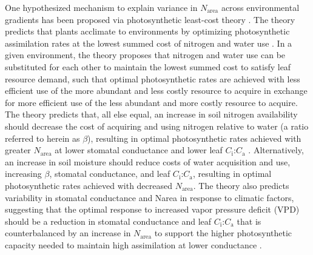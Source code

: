 One hypothesized mechanism to explain variance in $N_\mathrm{area}$ across environmental gradients has been proposed via photosynthetic least-cost theory . The theory predicts that plants acclimate to environments by optimizing photosynthetic assimilation rates at the lowest summed cost of nitrogen and water use . In a given environment, the theory proposes that nitrogen and water use can be substituted for each other to maintain the lowest summed cost to satisfy leaf resource demand, such that optimal photosynthetic rates are achieved with less efficient use of the more abundant and less costly resource to acquire in exchange for more efficient use of the less abundant and more costly resource to acquire. The theory predicts that, all else equal, an increase in soil nitrogen availability should decrease the cost of acquiring and using nitrogen relative to water (a ratio referred to herein as $\beta$), resulting in optimal photosynthetic rates achieved with greater $N_\mathrm{area}$ at lower stomatal conductance and lower leaf $C_\mathrm{i}$:$C_\mathrm{a}$ . Alternatively, an increase in soil moisture should reduce costs of water acquisition and use, increasing $\beta$, stomatal conductance, and leaf $C_\mathrm{i}$:$C_\mathrm{a}$, resulting in optimal photosynthetic rates achieved with decreased $N_\mathrm{area}$. The theory also predicts variability in stomatal conductance and Narea in response to climatic factors, suggesting that the optimal response to increased vapor pressure deficit (VPD) should be a reduction in stomatal conductance and leaf $C_\mathrm{i}$:$C_\mathrm{a}$ that is counterbalanced by an increase in $N_\mathrm{area}$ to support the higher photosynthetic capacity needed to maintain high assimilation at lower conductance .

